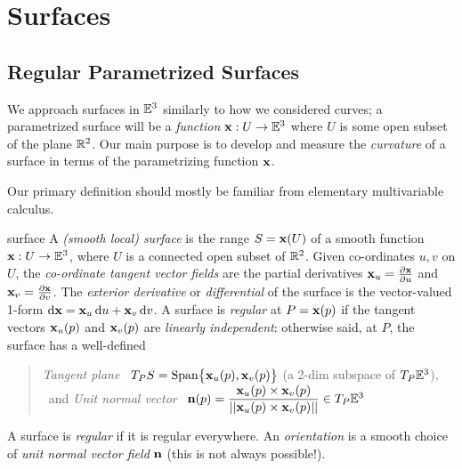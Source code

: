 \graphicspath{{surfaces/asy/}}

\section{Surfaces}\label{chap:surfaces}

\subsection{Regular Parametrized Surfaces}\label{sec:regularsurfaces}

We approach surfaces in $\E^3$ similarly to how we considered curves; a parametrized surface will be a \emph{function} $\vx:U\to\E^3$ where $U$ is some open subset of the plane $\R^2$. Our main purpose is to develop and measure the \emph{curvature} of a surface in terms of the parametrizing function $\vx$.\medbreak


Our primary definition should mostly be familiar from elementary multivariable calculus.

\begin{defn}{}{surface}
A \emph{(smooth local) surface\footnotemark} is the range $S=\vx(U)$ of a smooth function $\vx:U\to\E^3$, where $U$ is a connected open subset of $\R^2$.\smallbreak
Given co-ordinates $u,v$ on $U$, the \emph{co-ordinate tangent vector fields} are the partial derivatives $\vx_u=\partials[\vx]{u}$ and $\vx_v=\partials[\vx]{v}$.\smallbreak
The \emph{exterior derivative} or \emph{differential} of the surface is the vector-valued 1-form $\dvx=\vx_u\,\du+\vx_v\,\dv$.\smallbreak
A surface is \emph{regular} at $P=\vx(p)$ if the tangent vectors $\vx_u(p)$ and $\vx_v(p)$ are \emph{linearly independent}: otherwise said, at $P$, the surface has a well-defined
\begin{quote}
	\emph{Tangent plane} \ $T_PS=\Span\bigl\{\vx_u(p),\vx_v(p)\bigr\}$ (a 2-dim subspace of $T_P\E^3$), \ and \smallbreak
	\emph{Unit normal vector} \ $\vn(p)=\dfrac{\vx_u(p)\times\vx_v(p)}{\Nm{\vx_u(p)\times\vx_v(p)}} \in T_P\E^3$
\end{quote}
A surface is \emph{regular} if it is regular everywhere. An \emph{orientation} is a smooth choice of \emph{unit normal vector field} $\vn$ (this is not always possible!).
\end{defn}



